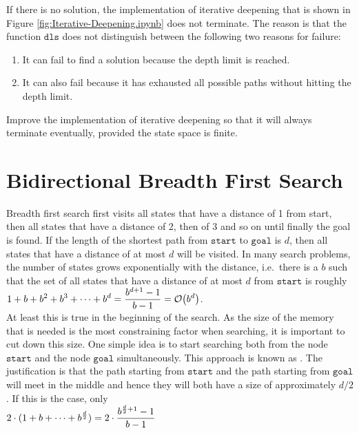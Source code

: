 \exercise
If there is no solution, the implementation of iterative deepening that is shown in Figure
\ref{fig:Iterative-Deepening.ipynb} does not terminate.  The reason is that the function $\texttt{dls}$ does not
distinguish between the following two reasons for failure:
\begin{enumerate}
\item It can fail to find a solution because the depth limit is reached.
\item It can also fail because it has exhausted all possible paths without hitting the depth limit.
\end{enumerate}
Improve the implementation of iterative deepening so that it will always terminate eventually, provided the
state space is finite.
\eoxs


\section{Bidirectional Breadth First Search}
Breadth first search first visits all states that have a distance of 1 from start, then all
states that have a distance of 2, then of 3 and so on until finally the goal is found.  If the length of the shortest path
from $\texttt{start}$ to $\texttt{goal}$ is $d$, then all states that have a distance of at most $d$ will be
visited.  In many search problems, the number of states grows exponentially with the distance, i.e.~there is
a  $b$ 
such that the set of all states that have a distance of at most $d$
from $\texttt{start}$ is roughly
\\[0.2cm]
\hspace*{1.3cm}
 $\displaystyle 1 + b + b^2 + b^3 + \cdots + b^d = \frac{b^{d+1} - 1}{b - 1} = \mathcal{O}\bigl(b^d\bigr)$.
\\[0.2cm]
At least this is true in the beginning of the search.  As the size of
the memory that is needed is the most constraining factor when searching, it is important to cut down this
size.  One simple idea is to start searching both from the node $\texttt{start}$ and the node $\texttt{goal}$
simultaneously.  This approach is known as .  
The justification is that the path starting from $\texttt{start}$ and the
path starting from $\texttt{goal}$ will meet in the middle and hence they will both have a size of approximately
$d/2$.  If this is the case, only
\\[0.2cm]
\hspace*{1.3cm}
$\displaystyle 2 \cdot ( 1 + b + \cdots + b^{\frac{d}{2}} ) = 2 \cdot \frac{b^{\frac{d}{2}+1} - 1}{b - 1}$
